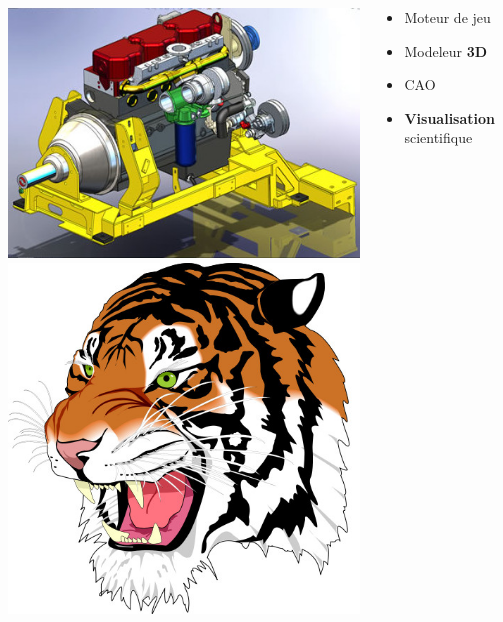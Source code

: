 \begin{frame}
\begin{columns}
\begin{column}{.25\textwidth}
\begin{center}
        \includegraphics[width=1.\textwidth]{images/solidworks.jpg} \\[5mm]
        \includegraphics[width=.8\textwidth]{images/tiger.jpg}
      \end{center}
    \end{column}
    \begin{column}{.5\textwidth}
      \begin{itemize}
      \item Moteur de jeu %
      \item Modeleur \textbf{3D}
      \item CAO
      \item \textbf{Visualisation} scientifique

\end{itemize}
\end{column}
\end{columns}
\end{frame}
